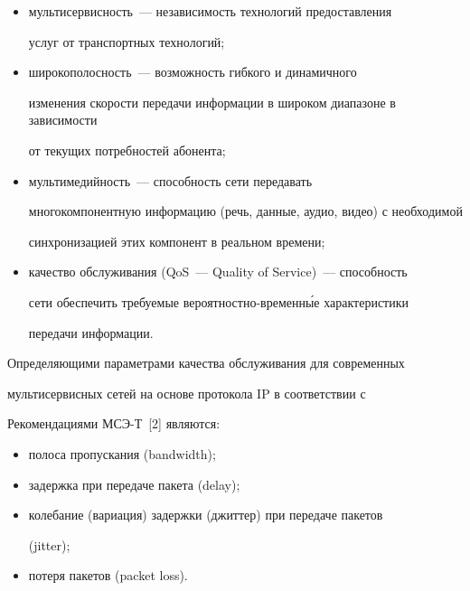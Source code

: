       \begin{itemize}


      \item мультисервисность~--- независимость технологий предоставления 


услуг от транспортных технологий;


      \item широкополосность~--- возможность гибкого и динамичного 


изменения скорости передачи информации в широком диапазоне в зависимости 


от текущих потребностей абонента;


      \item мультимедийность~--- способность сети передавать 


многокомпонентную информацию (речь, данные, аудио, видео) с необходимой 


синхронизацией этих компонент в реальном времени;


      \item качество обслуживания (QoS~--- Quality of Service)~--- способность 


сети обеспечить требуемые вероятностно-временн\'{ы}е характеристики 


передачи информации.


      \end{itemize}


      


      Определяющими параметрами качества обслуживания для современных 


мультисервисных сетей на основе протокола IP в соответствии с 


Рекомендациями МСЭ-Т~[2] являются:


      \begin{itemize}


      \item полоса пропускания (bandwidth);


      \item задержка при передаче пакета (delay);


      \item колебание (вариация) задержки (джиттер) при передаче пакетов 


(jitter);


      \item потеря пакетов (packet loss).


      \end{itemize}


